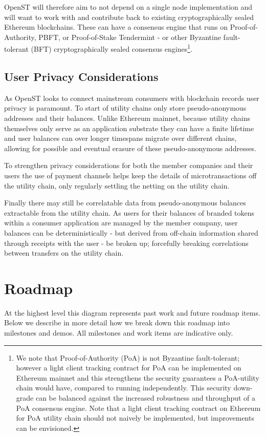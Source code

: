 \documentclass[12pt,a4paper, twocolumn]{article}
\begin{document}
OpenST will therefore aim to not depend on a single node implementation and will want to work with and contribute back to existing cryptographically sealed Ethereum blockchains.  These can have a consensus engine that runs on Proof-of-Authority, PBFT, or Proof-of-Stake Tendermint - or other Byzantine fault-tolerant (BFT) cryptographically sealed consensus engines\footnote{We note that Proof-of-Authority (PoA) is not Byzantine fault-tolerant; however a light client tracking contract for PoA can be implemented on Ethereum mainnet and this strengthens the security guarantees a PoA-utility chain would have, compared to running independently.  This security down-grade can be balanced against the increased robustness and throughput of a PoA consensus engine.  Note that a light client tracking contract on Ethereum for PoA utility chain should not naively be implemented, but improvements can be envisioned.}.\par

\subsection{User Privacy Considerations}
As OpenST looks to connect mainstream consumers with blockchain records user privacy is paramount.  To start of utility chains only store pseudo-anonymous addresses and their balances.   Unlike Ethereum mainnet, because utility chains themselves only serve as an application substrate they can have a finite lifetime and user balances can over longer timespans migrate over different chains, allowing for possible and eventual erasure of these pseudo-anonymous addresses. \par
To strengthen privacy considerations for both the member companies and their users the use of payment channels helps keep the details of microtransactions off the utility chain, only regularly settling the netting on the utility chain. \par
Finally there may still be correlatable data from pseudo-anonymous balances extractable from the utility chain.  As users for their balances of branded tokens within a consumer application are managed by the member company, user balances can be deterministically - but derived from off-chain information shared through receipts with the user - be broken up; forcefully breaking correlations between transfers on the utility chain. \par

\onecolumn
\section{Roadmap}
At the highest level this diagram represents past work and future roadmap items.  Below we describe in more detail how we break down this roadmap into milestones and demos.  All milestones and work items are indicative only.
\end{document}
